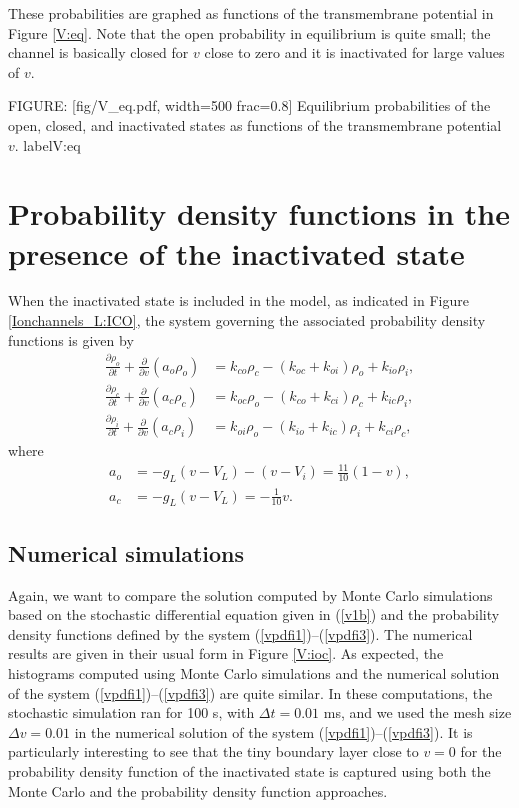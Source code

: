 These probabilities are graphed as functions of the transmembrane potential in Figure
\ref{V:eq}. Note that the open probability in equilibrium is quite small; the channel is basically closed
for $v$ close to zero and it is inactivated for large values of $v$.

FIGURE: [fig/V_eq.pdf, width=500 frac=0.8] Equilibrium probabilities of the open, closed, and inactivated states as functions of the transmembrane potential $v$. label{V:eq}

\section{Probability density functions in the presence of the inactivated
state \label{pdfi}}

When the inactivated state is included in the model, as indicated in Figure  \ref{Ionchannels_L:ICO},
 the system governing the associated probability density functions is given by
\begin{align}
\frac{\partial\rho_{o}}{\partial t}+\frac{\partial}{\partial v}\left(
a_{o}\rho_{o}\right)   &  =k_{co}\rho_{c}-(k_{oc}+k_{oi})\rho_{o}+k_{io}
\rho_{i},\label{vpdfi1}\\
\frac{\partial\rho_{c}}{\partial t}+\frac{\partial}{\partial v}\left(
a_{c}\rho_{c}\right)   &  =k_{oc}\rho_{o}-(k_{co}+k_{ci})\rho_{c}+k_{ic}
\rho_{i},\label{vpdfi2}\\
\frac{\partial\rho_{i}}{\partial t}+\frac{\partial}{\partial v}\left(
a_{c}\rho_{i}\right)   &  =k_{oi}\rho_{o}-(k_{io}+k_{ic})\rho_{i}+k_{ci}
\rho_{c}\label{vpdfi3},
\end{align}
where
\begin{align}
a_{o}  &  =-g_{L}\left(  v-V_{L}\right)  -(v-V_{i})=\frac{11}{10}\left(
1-v\right)  ,\label{vfluxi}\\
a_{c}  &  =-g_{L}\left(  v-V_{L}\right)  =-\frac{1}{10}v.\nonumber
\end{align}


\subsection{Numerical simulations}
Again, we want to compare the solution computed by Monte Carlo simulations based on the stochastic
differential equation given in (\ref{v1b}) and the probability density functions defined by the system  (\ref{vpdfi1})--(\ref{vpdfi3}).
The numerical results are given in their usual form in Figure \ref{V:ioc}. 
As expected, the histograms computed using Monte Carlo simulations
and the numerical solution of the system  (\ref{vpdfi1})--(\ref{vpdfi3}) are quite similar. In these computations, 
the stochastic simulation ran for 100 s, with $\Delta t=0.01$ ms, and we used the mesh size $\Delta v=0.01$ in the numerical solution of the system  (\ref{vpdfi1})--(\ref{vpdfi3}). It is particularly interesting to
see that the tiny boundary layer close to $v=0$ for the probability density function of the inactivated state is captured using both the Monte Carlo and the probability density function approaches.


